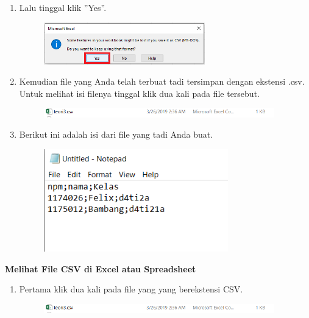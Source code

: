 \begin{enumerate}
\begin{enumerate}
		\item Lalu tinggal klik ''Yes''.
		
		\begin{figure}[H]
			\includegraphics[width=7cm]{figures/felix/Chapter4/t6.png}
			\centering
		\end{figure}
		
		\item Kemudian file yang Anda telah terbuat tadi tersimpan dengan ekstensi .csv. Untuk melihat isi filenya tinggal klik dua kali pada file tersebut.
		
		\begin{figure}[H]
			\includegraphics[width=10cm]{figures/felix/Chapter4/t8.png}
			\centering
		\end{figure}
		
		\item Berikut ini adalah isi dari file yang tadi Anda buat.
		
		\begin{figure}[H]
			\includegraphics[width=8cm]{figures/felix/Chapter4/t7.png}
			\centering
		\end{figure}
	\end{enumerate}
	
	\textbf{Melihat File CSV di Excel atau Spreadsheet}
	
	\begin{enumerate}
		\item Pertama klik dua kali pada file yang yang berekstensi CSV.
		
		\begin{figure}[H]
			\includegraphics[width=10cm]{figures/felix/Chapter4/t8.png}
			\centering
		\end{figure}
		

\end{enumerate}
\end{enumerate}

